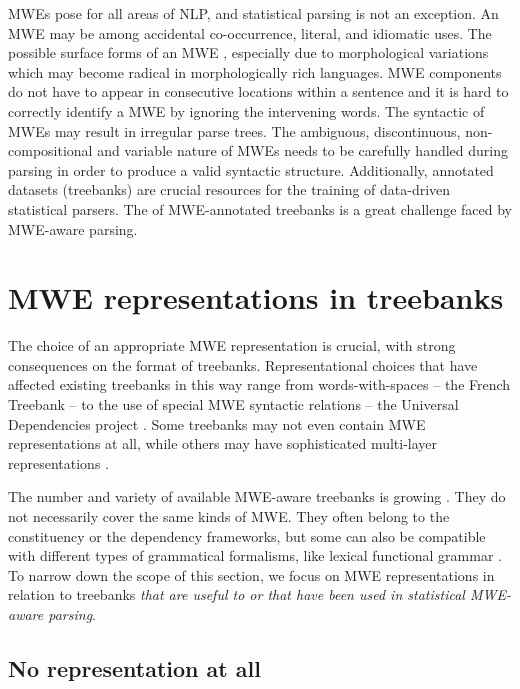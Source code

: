 \documentclass[output=paper]{LSP/langsci}
\begin{document}
MWEs pose  for all areas of NLP, and statistical parsing is not an exception.
An MWE may be  among accidental co-occurrence, literal, and idiomatic uses. The possible surface forms of an MWE , especially due to morphological variations which may become radical in morphologically rich languages. MWE components do not have to appear in consecutive locations within a sentence and it is hard to correctly identify a  MWE by ignoring the intervening words. 
The syntactic  of MWEs may result in irregular parse trees.
The ambiguous, discontinuous, non-compositional and variable nature of MWEs needs to be carefully handled during parsing in order to produce a valid syntactic structure. 
Additionally, annotated datasets (treebanks) are crucial resources for the training of data-driven statistical parsers. 
The  of MWE-annotated treebanks is a great challenge faced by MWE-aware parsing. 


%
\section{MWE representations in treebanks} 
\label{sec:representation}


The choice of an appropriate MWE representation is crucial, with strong consequences on the format of treebanks. Representational choices that have affected existing treebanks in this way range
from words-with-spaces -- \eg{} the French Treebank \citep{candito:2009} -- to the use of special MWE syntactic relations -- \eg{} the Universal Dependencies project \citep{nivre16}. Some treebanks may not even contain MWE representations at all, 
while others may have sophisticated multi-layer representations 
\citep{prague}. 


The number and variety of available MWE-aware treebanks is growing \citep{rosen:2015}. 
They do not necessarily cover the same kinds of MWE. 
They often belong to the constituency or the dependency frameworks, but
some can also be compatible with different types of grammatical formalisms, like lexical functional grammar \citep{dyvik:2016}. 
To narrow down the scope of this section, we focus on MWE representations in relation to treebanks \emph{that are useful to or that have been used in statistical MWE-aware parsing}.

\subsection{No representation at all}
\label{ssec:norep}
\end{document}
